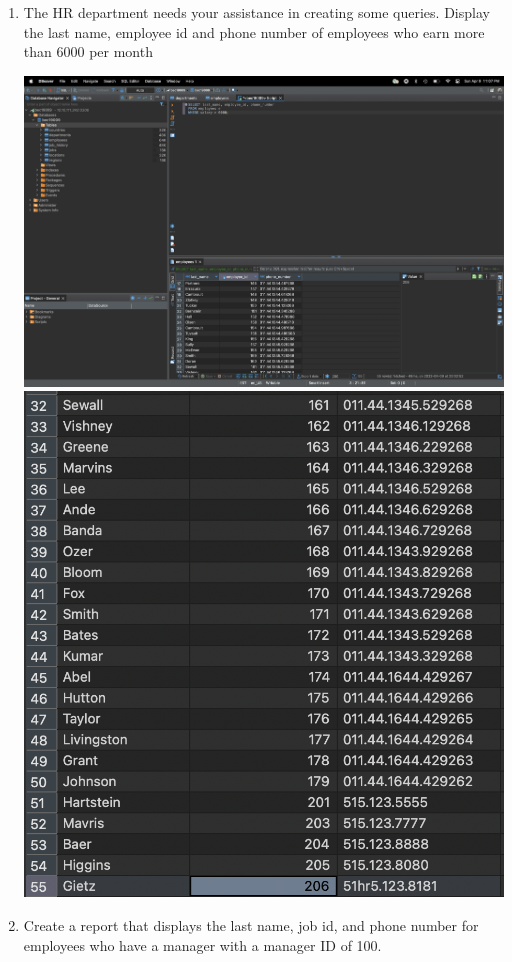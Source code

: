 \documentclass{article}
\begin{document}
\begin{enumerate}
    \item The HR department needs your assistance in creating some queries. Display the last name, employee id and phone number of employees who earn more than 6000 per month
    \begin{center}
        \includegraphics*[scale=.16]{1.png}
        \includegraphics*[scale=.4]{1.2.png}
    \end{center}
    \item Create a report that displays the last name, job id, and phone number for employees who have a manager with a manager ID of 100.

\end{enumerate}
\end{document}
